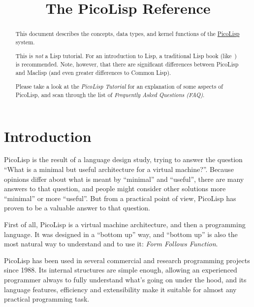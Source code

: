 \title{The PicoLisp Reference}

\maketitle




\begin{abstract}

This document describes the concepts, data types, and kernel functions
of the \href{http://software-lab.de/down.html}{PicoLisp} system.

This is \emph{not} a Lisp tutorial. For an introduction to Lisp, a
traditional Lisp book (like~\cite{lisp1}) is recommended. Note, however,
that there are significant differences between PicoLisp and Maclisp
(and even greater differences to Common Lisp).

Please take a look at the \emph{PicoLisp Tutorial} for an
explanation of some aspects of PicoLisp, and scan through the list of
\emph{Frequently Asked Questions (FAQ)}.

\end{abstract}  

 
\section{Introduction}
\label{sec:refm-introduction}


PicoLisp is the result of a language design study, trying to answer the
question ``What is a minimal but useful architecture for a virtual
machine?''. Because opinions differ about what is meant by ``minimal'' and
``useful'', there are many answers to that question, and people might
consider other solutions more ``minimal'' or more ``useful''. But from a
practical point of view, PicoLisp has proven to be a valuable answer to
that question.

First of all, PicoLisp is a virtual machine architecture, and then a
programming language. It was designed in a ``bottom up'' way, and ``bottom
up'' is also the most natural way to understand and to use it: \emph{Form Follows Function}.

PicoLisp has been used in several commercial and research programming
projects since 1988. Its internal structures are simple enough, allowing
an experienced programmer always to fully understand what's going on
under the hood, and its language features, efficiency and extensibility
make it suitable for almost any practical programming task.

